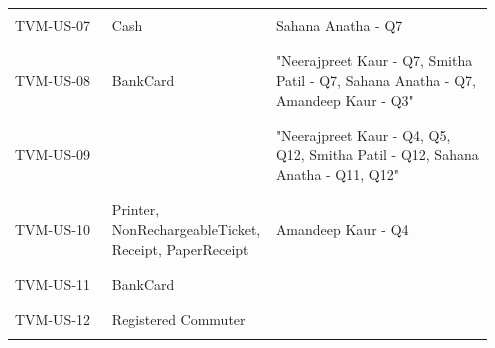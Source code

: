 \documentclass[a4paper,12pt]{report}
\begin{document}
\begin{longtable}{ | p{0.2\linewidth} | p{0.3\linewidth} | p{0.45\linewidth} |}
	
	& & \\ 
	TVM-US-07 & Cash & Sahana Anatha - Q7 \\
	& & \\ 
	\hline
	
	
	& & \\ 
	TVM-US-08 & BankCard & "Neerajpreet Kaur - Q7, Smitha Patil - Q7, Sahana Anatha - Q7, Amandeep Kaur - Q3" \\
	& & \\ 
	\hline
	
	& & \\ 
	TVM-US-09 &  & "Neerajpreet Kaur - Q4, Q5, Q12, Smitha Patil - Q12, Sahana Anatha - Q11, Q12" \\
	& & \\ 
	\hline
	
	
	& & \\ 
	TVM-US-10 & Printer, NonRechargeableTicket, Receipt, PaperReceipt & Amandeep Kaur - Q4 \\
	& & \\ 
	\hline
	
	
	& & \\ 
	TVM-US-11 & BankCard &  \\
	& & \\ 
	\hline
	
	
	& & \\ 
	TVM-US-12 & Registered Commuter &  \\
	& & \\ 
	\hline
	
	
\end{longtable}



\vspace{1cm}
\end{document}
